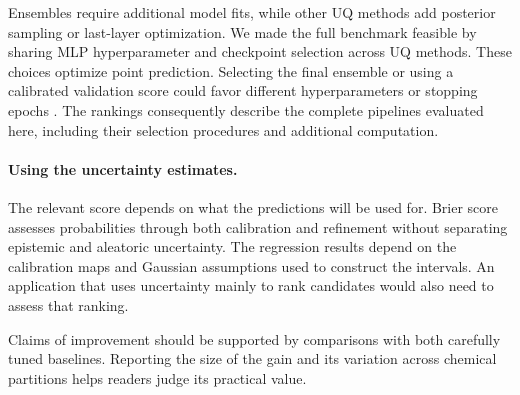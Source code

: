 Ensembles require additional model fits, while other UQ methods add posterior sampling or last-layer
optimization. We made the full benchmark feasible by sharing MLP hyperparameter and checkpoint
selection across UQ methods. These choices optimize point prediction. Selecting the final
ensemble or using a calibrated validation score could favor different hyperparameters or stopping
epochs \citep{ranjan2024posthoc,fredsgaard2025joint}. The rankings consequently describe the complete
pipelines evaluated here, including their selection procedures and additional computation.

\paragraph{Using the uncertainty estimates.}
The relevant score depends on what the predictions will be used for. Brier score assesses
probabilities through both calibration and refinement without separating epistemic and aleatoric
uncertainty. The regression results depend on the calibration maps and Gaussian assumptions used to
construct the intervals. An application that uses uncertainty mainly to rank candidates would also
need to assess that ranking.

Claims of improvement should be supported by comparisons with both carefully tuned baselines.
Reporting the size of the gain and its variation across chemical partitions helps readers judge
its practical value.

